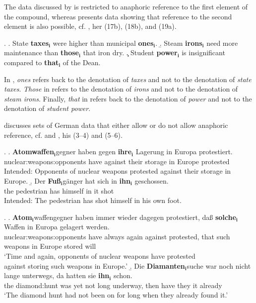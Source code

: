 The data discussed by \citet{Wardetal:1991} is restricted to anaphoric reference to
the first element of the compound, whereas \citet{Levi:1977} presents data showing
that reference to the second element is also possible, cf. \Next, her (17b), (18b), and
(19a).

\ex. \a. State \textbf{taxes}$_{\mathbf{i}}$ were higher than municipal \textbf{ones}$_{\mathbf{i}}$.
\b. Steam \textbf{irons}$_{\mathbf{i}}$ need more maintenance than \textbf{those}$_{\mathbf{i}}$ that iron dry.
\c. Student \textbf{power}$_{\mathbf{i}}$ is insignificant compared to \textbf{that}$_{\mathbf{i}}$ of the Dean.

In \Last[a], \emph{ones} refers back to the denotation of \emph{taxes} and not to the denotation of \emph{state taxes}.
\emph{Those} in \Last[b] refers to the denotation of \emph{irons} and not to
the denotation of \emph{steam irons}. Finally, \emph{that} in \Last[c] refers back to the denotation of \emph{power} and not to the denotation
of \emph{student power}.

\citet{Coulmas:1988} discusses sets of German data that either allow or do not
allow anaphoric reference, cf. \Next and \NNext, his (3--4) and (5--6). 

\ex. \a. \gll *\textbf{Atomwaffen}$_{\mathbf{i}}$gegner haben gegen \textbf{ihre}$_{\mathbf{i}}$ Lagerung in
Europa protestiert.\\
nuclear:weapons:opponents have against their storage in Europe
protested\\
Intended: Opponents of nuclear weapons protested against their storage
in Europe.
\b. \gll *Der \textbf{Fuß}$_{\mathbf{i}}$gänger hat sich in \textbf{ihn}$_{\mathbf{i}}$ geschossen.\\
the pedestrian has himself in it shot\\
Intended: The pedestrian has shot himself in his own foot.

\ex. \a. \gll \textbf{Atom}$_{\mathbf{i}}$waffengegner haben immer wieder dagegen protestiert, daß \textbf{solche}$_{\mathbf{i}}$
Waffen in Europa gelagert werden.\\
nuclear:weapons:opponents have always again against protested, that
such weapons in Europe stored will\\
`Time and again, opponents of nuclear weapons have protested\\ against
storing such weapons in Europe.'
\b. \gll Die \textbf{Diamanten}$_{\mathbf{i}}$suche war noch nicht lange unterwegs, da hatten
sie \textbf{ihn}$_{\mathbf{i}}$ schon.\\
the diamond:hunt was yet not long underway, then have they it
already\\
`The diamond hunt had not been on for long when they already found it.'


